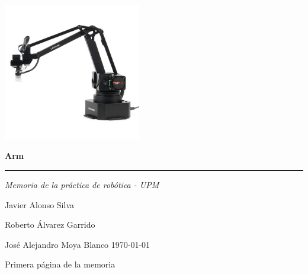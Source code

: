 \documentclass[a4paper,12pt,titlepage]{article}
\begin{document}
\begin{titlepage}
    \vspace*{4cm}
    \begin{center}
        \includegraphics[height=6cm]{images/uarm.jpg}
    \end{center}
    \hfill
    {\fontsize{28}{34}\selectfont\bfseries {\textmu}Arm}
    {\color{gris}\hrule}
    \Large{\itshape Memoria de la práctica de robótica - UPM}
    \vfill
    {\large Javier Alonso Silva

        Roberto Álvarez Garrido

        José Alejandro Moya Blanco
        \hfill \today}
\end{titlepage}

Primera página de la memoria
\end{document}
